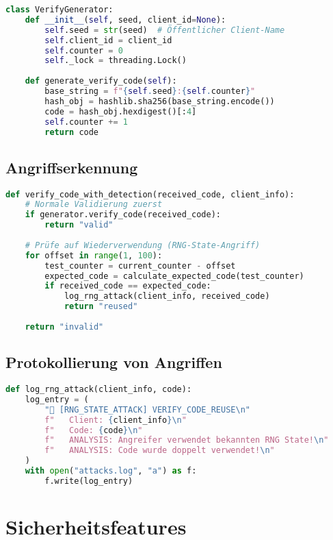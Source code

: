 \documentclass[10pt,a4paper]{article}
\begin{document}
\begin{lstlisting}[language=Python,caption=Verify-Code-Generator]
class VerifyGenerator:
    def __init__(self, seed, client_id=None):
        self.seed = str(seed)  # Öffentlicher Client-Name
        self.client_id = client_id
        self.counter = 0
        self._lock = threading.Lock()
    
    def generate_verify_code(self):
        base_string = f"{self.seed}:{self.counter}"
        hash_obj = hashlib.sha256(base_string.encode())
        code = hash_obj.hexdigest()[:4]
        self.counter += 1
        return code
\end{lstlisting}

\subsection{Angriffserkennung}

\begin{lstlisting}[language=Python,caption=Erweiterte Verify-Code-Validierung]
def verify_code_with_detection(received_code, client_info):
    # Normale Validierung zuerst
    if generator.verify_code(received_code):
        return "valid"
    
    # Prüfe auf Wiederverwendung (RNG-State-Angriff)
    for offset in range(1, 100):
        test_counter = current_counter - offset
        expected_code = calculate_expected_code(test_counter)
        if received_code == expected_code:
            log_rng_attack(client_info, received_code)
            return "reused"
    
    return "invalid"
\end{lstlisting}

\subsection{Protokollierung von Angriffen}

\begin{lstlisting}[language=Python,caption=Angriffsprotokollierung]
def log_rng_attack(client_info, code):
    log_entry = (
        "🚨 [RNG_STATE_ATTACK] VERIFY_CODE_REUSE\n"
        f"   Client: {client_info}\n"
        f"   Code: {code}\n"
        f"   ANALYSIS: Angreifer verwendet bekannten RNG State!\n"
        f"   ANALYSIS: Code wurde doppelt verwendet!\n"
    )
    with open("attacks.log", "a") as f:
        f.write(log_entry)
\end{lstlisting}

\section{Sicherheitsfeatures}
\end{document}
